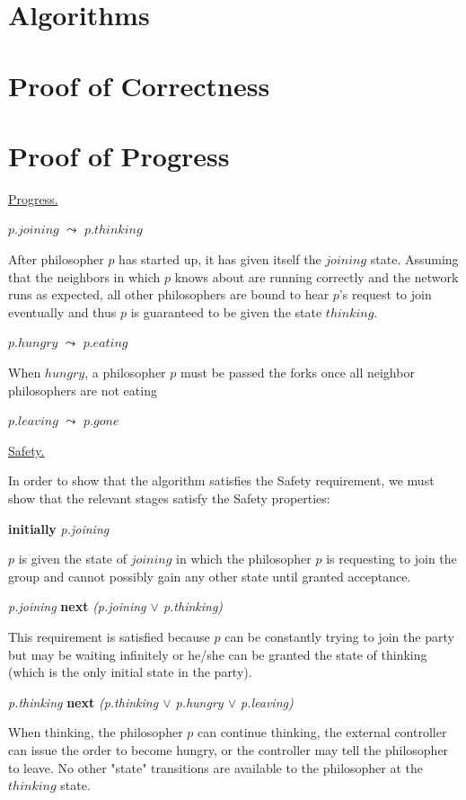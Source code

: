 \documentclass[11pt]{article}
\begin{document}
\section{Algorithms}

\section{Proof of Correctness}

\section{Proof of Progress}
\underline{\large{Progress.}}

$p.joining$ $\leadsto$ $p.thinking$

\indent After philosopher $p$ has started up, it has given itself the $joining$ state. Assuming that the neighbors in which $p$ knows about are running correctly and the network runs as expected, all other philosophers are bound to hear $p$'s request to join eventually and thus $p$ is guaranteed to be given the state $thinking$.

$p.hungry$ $\leadsto$ $p.eating$

\indent When $hungry$, a philosopher $p$ must be passed the forks once all neighbor philosophers are not eating

$p.leaving$ $\leadsto$ $p.gone$

\indent


\underline{\large{Safety.}}

In order to show that the algorithm satisfies the Safety requirement, we must show that the relevant stages satisfy the Safety properties:

{\bfseries initially} {\it p.joining}

\indent $p$ is given the state of $joining$ in which the philosopher $p$ is requesting to join the group and cannot possibly gain any other state until granted acceptance.

{\it p.joining} {\bfseries next} {\it (p.joining $\vee$ p.thinking)}

\indent This requirement is satisfied because $p$ can be constantly trying to join the party but may be waiting infinitely or he/she can be granted the state of thinking (which is the only initial state in the party).

{\it p.thinking} {\bfseries next} {\it (p.thinking $\vee$ p.hungry $\vee$ p.leaving)}

\indent When thinking, the philosopher $p$ can continue thinking, the external controller can issue the order to become hungry, or the controller may tell the philosopher to leave. No other "state" transitions are available to the philosopher at the $thinking$ state. 
\end{document}
